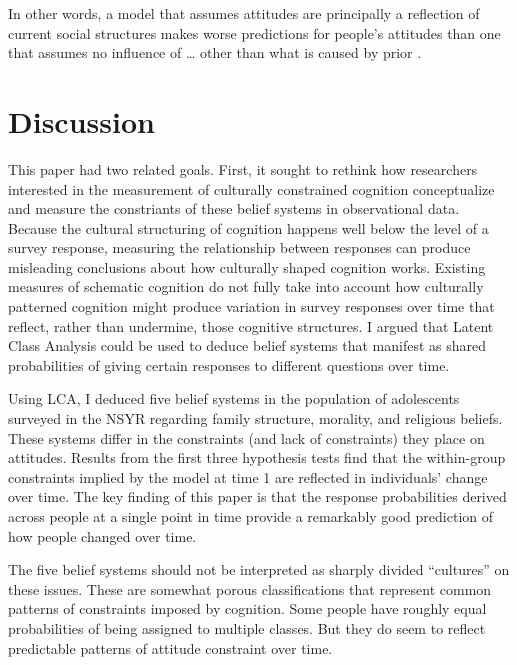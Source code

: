 \documentclass[12pt,]{article}
\begin{document}
In other words, a model that assumes attitudes are principally a reflection of current social structures makes worse predictions for people's attitudes than one that assumes no influence of \ldots{} other than what is caused by prior .

\hypertarget{discussion}{%
\section{Discussion}\label{discussion}}

This paper had two related goals. First, it sought to rethink how researchers interested in the measurement of culturally constrained cognition conceptualize and measure the constriants of these belief systems in observational data. Because the cultural structuring of cognition happens well below the level of a survey response, measuring the relationship between responses can produce misleading conclusions about how culturally shaped cognition works. Existing measures of schematic cognition do not fully take into account how culturally patterned cognition might produce variation in survey responses over time that reflect, rather than undermine, those cognitive structures. I argued that Latent Class Analysis could be used to deduce belief systems that manifest as shared probabilities of giving certain responses to different questions over time.

Using LCA, I deduced five belief systems in the population of adolescents surveyed in the NSYR regarding family structure, morality, and religious beliefs. These systems differ in the constraints (and lack of constraints) they place on attitudes. Results from the first three hypothesis tests find that the within-group constraints implied by the model at time 1 are reflected in individuals' change over time. The key finding of this paper is that the response probabilities derived across people at a single point in time provide a remarkably good prediction of how people changed over time.

The five belief systems should not be interpreted as sharply divided ``cultures'' on these issues. These are somewhat porous classifications that represent common patterns of constraints imposed by cognition. Some people have roughly equal probabilities of being assigned to multiple classes. But they do seem to reflect predictable patterns of attitude constraint over time.
\end{document}
